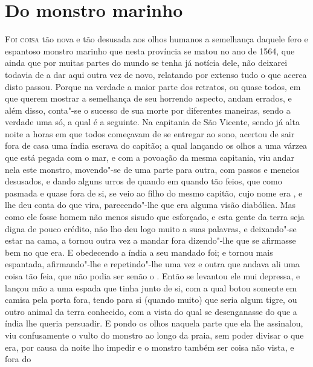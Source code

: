 \chapter[Do monstro marinho]{Do monstro marinho}

\noindent\textsc{Foi coisa} tão nova e tão desusada aos olhos humanos a semelhança		%
daquele fero e espantoso monstro marinho que nesta província se matou no
ano de 1564, que ainda que por muitas partes do mundo se tenha já
notícia dele, não deixarei todavia de a dar aqui outra vez de novo,
relatando por extenso tudo o que acerca disto passou. Porque na verdade
a maior parte dos retratos, ou quase todos, em que querem mostrar a
semelhança de seu horrendo aspecto, andam errados, e além disso,
conta"-se o sucesso de sua morte por diferentes maneiras, sendo a
verdade uma só, a qual é a seguinte. Na capitania de São Vicente, sendo				%
já alta noite a horas em que todos começavam de se entregar ao sono,
acertou de sair fora de casa uma índia escrava do capitão; a qual
lançando os olhos a uma várzea que está pegada com o mar, e com a
povoação da mesma capitania, viu andar nela este monstro, movendo"-se de
uma parte para outra, com passos e meneios desusados, e dando alguns urros
de quando em quando tão feios, que como pasmada e quase fora de si, se
veio ao filho do mesmo capitão, cujo nome era , e lhe
deu conta do que vira, parecendo"-lhe que era alguma visão diabólica.
Mas como ele fosse homem não menos sisudo que esforçado, e esta gente
da terra seja digna de pouco crédito, não lho deu logo muito a suas
palavras, e deixando"-se estar na cama, a tornou outra vez a mandar
fora dizendo"-lhe que se afirmasse bem no que era. E obedecendo a índia
a seu mandado foi; e tornou mais espantada, afirmando"-lhe e
repetindo"-lhe uma vez e outra que andava ali uma coisa tão feia, que não
podia ser senão o . Então se levantou ele mui depressa, e
lançou mão a uma espada que tinha junto de si, com a qual botou somente
em camisa pela porta fora, tendo para si (quando muito) que seria algum
tigre, ou outro animal da terra conhecido, com a vista do qual se			%
desenganasse do que a índia lhe queria persuadir. E pondo os olhos
naquela parte que ela lhe assinalou, viu confusamente o vulto do
monstro ao longo da praia, sem poder divisar o que era, por causa da
noite lho impedir e o monstro também ser coisa não vista, e fora do
